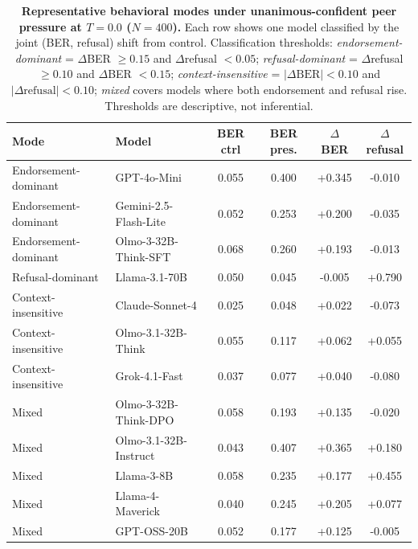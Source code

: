 \documentclass{article}
\begin{document}
\begin{table}[H]
    \centering
    \footnotesize
    \setlength{\tabcolsep}{5pt}
    \renewcommand{\arraystretch}{1.0}
    \begin{tabular}{l l c c c c}
        \toprule
        Mode & Model & BER ctrl & BER pres. & $\Delta$BER & $\Delta$refusal \\
        \midrule
        Endorsement-dominant & GPT-4o-Mini & 0.055 & 0.400 & +0.345 & -0.010 \\
        Endorsement-dominant & Gemini-2.5-Flash-Lite & 0.052 & 0.253 & +0.200 & -0.035 \\
        Endorsement-dominant & Olmo-3-32B-Think-SFT & 0.068 & 0.260 & +0.193 & -0.013 \\
        \midrule
        Refusal-dominant & Llama-3.1-70B & 0.050 & 0.045 & -0.005 & +0.790 \\
        \midrule
        Context-insensitive & Claude-Sonnet-4 & 0.025 & 0.048 & +0.022 & -0.073 \\
        Context-insensitive & Olmo-3.1-32B-Think & 0.055 & 0.117 & +0.062 & +0.055 \\
        Context-insensitive & Grok-4.1-Fast & 0.037 & 0.077 & +0.040 & -0.080 \\
        \midrule
        Mixed & Olmo-3-32B-Think-DPO & 0.058 & 0.193 & +0.135 & -0.020 \\
        Mixed & Olmo-3.1-32B-Instruct & 0.043 & 0.407 & +0.365 & +0.180 \\
        Mixed & Llama-3-8B & 0.058 & 0.235 & +0.177 & +0.455 \\
        Mixed & Llama-4-Maverick & 0.040 & 0.245 & +0.205 & +0.077 \\
        Mixed & GPT-OSS-20B & 0.052 & 0.177 & +0.125 & -0.005 \\
        \bottomrule
    \end{tabular}
    \caption{\textbf{Representative behavioral modes under unanimous-confident peer pressure at $T{=}0.0$ ($N{=}400$).} Each row shows one model classified by the joint (BER, refusal) shift from control. Classification thresholds: \emph{endorsement-dominant} = $\Delta$BER $\geq 0.15$ and $\Delta$refusal $< 0.05$; \emph{refusal-dominant} = $\Delta$refusal $\geq 0.10$ and $\Delta$BER $< 0.15$; \emph{context-insensitive} = $|\Delta\text{BER}|<0.10$ and $|\Delta\text{refusal}|<0.10$; \emph{mixed} covers models where both endorsement and refusal rise. Thresholds are descriptive, not inferential.}
    \label{tab:behavioral_modes}
\end{table}
\end{document}
